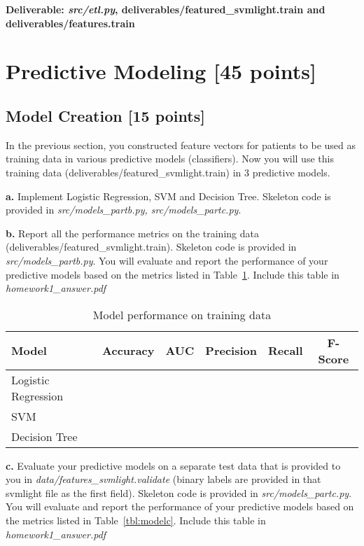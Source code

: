 \documentclass[12pt]{article}
\begin{document}
\textbf{Deliverable: \textit{src/etl.py}, deliverables/featured\_svmlight.train and deliverables/features.train}

\section{Predictive Modeling [45 points]}
\subsection{Model Creation [15 points]}
In the previous section, you constructed feature vectors for patients to be used as training data in various predictive models (classifiers). Now you will use this training data (deliverables/featured\_svmlight.train) in 3 predictive models. 

\textbf{a.} Implement Logistic Regression, SVM and Decision Tree. Skeleton code is provided in \textit{src/models\_partb.py, src/models\_partc.py}.

\textbf{b.} Report all the performance metrics on the training data (deliverables/featured\_svmlight.train). Skeleton code is provided in \textit{src/models\_partb.py}. You will evaluate and report the performance of your predictive models based on the metrics listed in Table~\ref{tbl:modelb}. Include this table in \textit{homework1\_answer.pdf}\\ 

\begin{table}[h]
	\centering
	\begin{tabular}{@{}lccccc@{}}
		\toprule
		Model & Accuracy & AUC & Precision & Recall & F-Score  \\ \midrule
		Logistic Regression & & & & &\\
		SVM & & & & &\\
		Decision Tree & & & & &\\
		\bottomrule
	\end{tabular}
	\caption{Model performance on training data}
	\label{tbl:modelb}
\end{table}

\textbf{c.} Evaluate your predictive models on a separate test data that is provided to you in \textit{data/features\_svmlight.validate} (binary labels are provided in that svmlight file as the first field). Skeleton code is provided in \textit{src/models\_partc.py}. You will evaluate and report the performance of your predictive models based on the metrics listed in Table~\ref{tbl:modelc}. Include this table in \textit{homework1\_answer.pdf}\\ 
\end{document}
